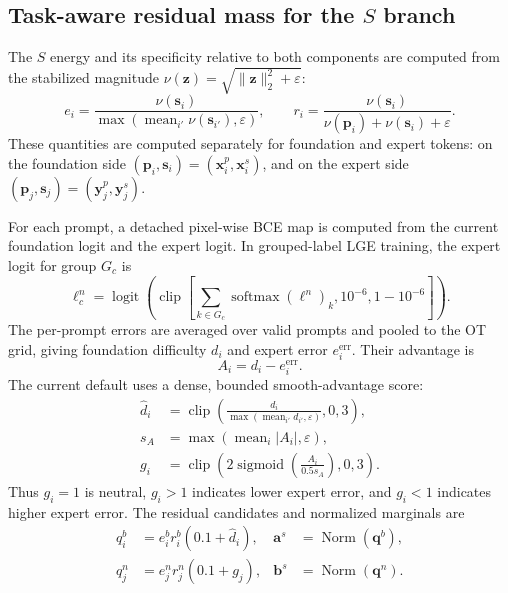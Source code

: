 \documentclass[10pt]{article}
\newcommand{\eps}{\varepsilon}
\newcommand{\Norm}{\operatorname{Norm}}
\newcommand{\clip}{\operatorname{clip}}
\newcommand{\sigm}{\operatorname{sigmoid}}
\begin{document}
\subsection{Task-aware residual mass for the $S$ branch}

The $S$ energy and its specificity relative to both components are
computed from the stabilized magnitude
$\nu(\bm{z})=\sqrt{\|\bm{z}\|_2^2+\eps}$:
\begin{equation}
    e_i=\frac{\nu(\bm{s}_i)}
              {\max(\operatorname{mean}_{i'}\nu(\bm{s}_{i'}),\eps)},
    \qquad
    r_i=\frac{\nu(\bm{s}_i)}
              {\nu(\bm{p}_i)+\nu(\bm{s}_i)+\eps}.
    \label{eq:s-energy-specificity}
\end{equation}
These quantities are computed separately for foundation and expert tokens: on
the foundation side $(\bm{p}_i,\bm{s}_i)=(\bm{x}^p_i,\bm{x}^s_i)$, and on the
expert side $(\bm{p}_j,\bm{s}_j)=(\bm{y}^p_j,\bm{y}^s_j)$.

For each prompt, a detached pixel-wise BCE map is computed from the current
foundation logit and the expert logit.  In grouped-label LGE training, the expert
logit for group $G_c$ is
\begin{equation}
    \ell^n_c
    =\operatorname{logit}\!\left(
       \clip\!\left[
       \sum_{k\in G_c}\operatorname{softmax}(\bm{\ell}^n)_k,
       10^{-6},1-10^{-6}
       \right]\right).
    \label{eq:grouped-expert-logit}
\end{equation}
The per-prompt errors are averaged over valid prompts and pooled to the OT grid,
giving foundation difficulty $d_i$ and expert error $e_i^{\mathrm{err}}$.  Their
advantage is
\begin{equation}
    A_i=d_i-e_i^{\mathrm{err}}.
\end{equation}
The current default uses a dense, bounded smooth-advantage score:
\begin{align}
    \widehat d_i
      &=\clip\!\left(
        \frac{d_i}{\max(\operatorname{mean}_{i'}d_{i'},\eps)},0,3
        \right),\\
    s_A&=\max\!\left(\operatorname{mean}_i|A_i|,\eps\right),\\
    g_i&=\clip\!\left(
       2\sigm\!\left(\frac{A_i}{0.5s_A}\right),0,3
       \right).
    \label{eq:smooth-gain}
\end{align}
Thus $g_i=1$ is neutral, $g_i>1$ indicates lower expert error, and $g_i<1$
indicates higher expert error.  The residual candidates and normalized marginals
are
\begin{align}
    q_i^b&=e_i^b r_i^b(0.1+\widehat d_i),&
    \bm{a}^s&=\Norm(\bm{q}^b),\\
    q_j^n&=e_j^n r_j^n(0.1+g_j),&
    \bm{b}^s&=\Norm(\bm{q}^n).
    \label{eq:s-mass}
\end{align}
\end{document}
